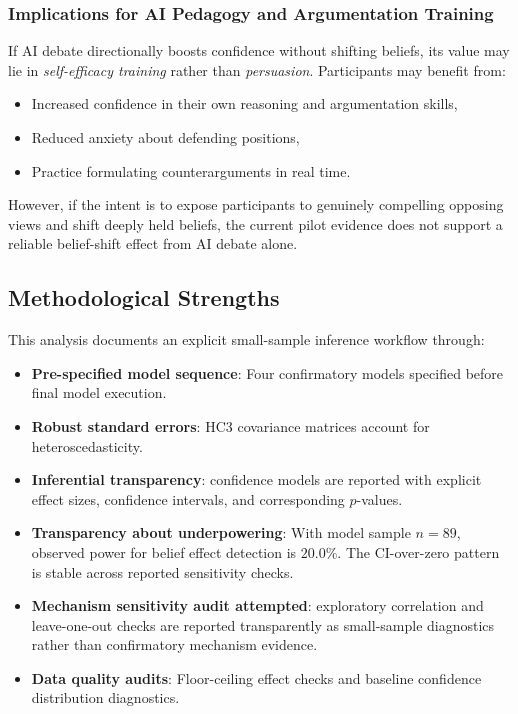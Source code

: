 \subsubsection{Implications for AI Pedagogy and Argumentation Training}

If AI debate directionally boosts confidence without shifting beliefs, its value may lie in \textit{self-efficacy training}
rather than \textit{persuasion}. Participants may benefit from:
\begin{itemize}
    \item Increased confidence in their own reasoning and argumentation skills,
    \item Reduced anxiety about defending positions,
    \item Practice formulating counterarguments in real time.
\end{itemize}

However, if the intent is to expose participants to genuinely compelling opposing views and shift deeply held beliefs,
the current pilot evidence does not support a reliable belief-shift effect from AI debate alone.

\subsection{Methodological Strengths}

This analysis documents an explicit small-sample inference workflow through:
\begin{itemize}
      \item \textbf{Pre-specified model sequence}: Four confirmatory models specified before final model execution.
    \item \textbf{Robust standard errors}: HC3 covariance matrices account for heteroscedasticity.
      \item \textbf{Inferential transparency}: confidence models are reported with explicit effect sizes,
                    confidence intervals, and corresponding $p$-values.
                                    \item \textbf{Transparency about underpowering}: With model sample $n = 89$, observed power for belief effect detection is $20.0\%$.
                                                                              The CI-over-zero pattern is stable across reported sensitivity checks.
      \item \textbf{Mechanism sensitivity audit attempted}: exploratory correlation and leave-one-out checks
                    are reported transparently as small-sample diagnostics rather than confirmatory mechanism evidence.
      \item \textbf{Data quality audits}: Floor-ceiling effect checks and baseline confidence distribution diagnostics.
\end{itemize}

